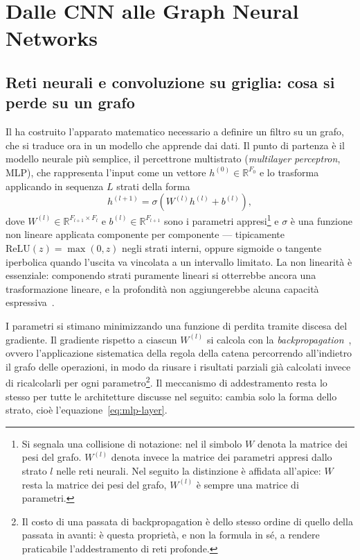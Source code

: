 \chapter{Dalle CNN alle Graph Neural Networks}
\label{ch:from-cnn-to-gnn}

\section{Reti neurali e convoluzione su griglia: cosa si perde su un grafo}
\label{sec:neural-networks-classical-convolution-recap}

Il  ha costruito l'apparato matematico necessario a definire un filtro su un grafo, che si traduce ora in un modello che apprende dai dati. Il punto di partenza è il modello neurale più semplice, il percettrone multistrato (\emph{multilayer perceptron}, MLP), che rappresenta l'input come un vettore $h^{(0)}\in\mathbb{R}^{F_0}$ e lo trasforma applicando in sequenza $L$ strati della forma
\begin{equation}
\label{eq:mlp-layer}
h^{(l+1)} = \sigma\!\left(W^{(l)}h^{(l)} + b^{(l)}\right),
\end{equation}
dove $W^{(l)}\in\mathbb{R}^{F_{l+1}\times F_l}$ e $b^{(l)}\in\mathbb{R}^{F_{l+1}}$ sono i parametri appresi\footnote{Si segnala una collisione di notazione: nel  il simbolo $W$ denota la matrice dei pesi del grafo. $W^{(l)}$ denota invece la matrice dei parametri appresi dallo strato $l$ nelle reti neurali. Nel seguito la distinzione è affidata all'apice: $W$ resta la matrice dei pesi del grafo, $W^{(l)}$ è sempre una matrice di parametri.} e $\sigma$ è una funzione non lineare applicata componente per componente — tipicamente $\mathrm{ReLU}(z)=\max(0,z)$ negli strati interni, oppure sigmoide o tangente iperbolica quando l'uscita va vincolata a un intervallo limitato. La non linearità è essenziale: componendo strati puramente lineari si otterrebbe ancora una trasformazione lineare, e la profondità non aggiungerebbe alcuna capacità espressiva~\cite{goodfellow2016deep}.

I parametri si stimano minimizzando una funzione di perdita tramite discesa del gradiente. Il gradiente rispetto a ciascun $W^{(l)}$ si calcola con la \emph{backpropagation}~\cite{rumelhart1986learning}, ovvero l'applicazione sistematica della regola della catena percorrendo all'indietro il grafo delle operazioni, in modo da riusare i risultati parziali già calcolati invece di ricalcolarli per ogni parametro\footnote{Il costo di una passata di backpropagation è dello stesso ordine di quello della passata in avanti: è questa proprietà, e non la formula in sé, a rendere praticabile l'addestramento di reti profonde.}. Il meccanismo di addestramento resta lo stesso per tutte le architetture discusse nel seguito: cambia solo la forma dello strato, cioè l'equazione~\eqref{eq:mlp-layer}.

